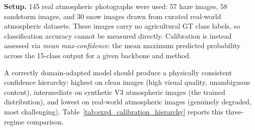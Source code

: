 \noindent \textbf{Setup.} 145 real atmospheric photographs were used: 57 haze images, 58 sandstorm images, and 30 snow images drawn from curated real-world atmospheric datasets. These images carry no agricultural GT class labels, so classification accuracy cannot be measured directly. Calibration is instead assessed via \emph{mean max-confidence}: the mean maximum predicted probability across the 15-class output for a given backbone and method.

\noindent A correctly domain-adapted model should produce a physically consistent confidence hierarchy: highest on clean images (high visual quality, unambiguous content), intermediate on synthetic V3 atmospheric images (the trained distribution), and lowest on real-world atmospheric images (genuinely degraded, most challenging). Table~\ref{tab:exp4_calibration_hierarchy} reports this three-regime comparison.

\begin{table}[htbp]
\centering
\caption{Experiment~4: Mean max-confidence of zero-shot CLIP vs V3-adapted linear probe across three data regimes and per weather domain. Lower confidence on atmospheric images reflects correct domain-awareness. The probe maintains the physically expected ordering (clean $>$ synthetic $>$ real-world) on both backbones.}
\label{tab:exp4_calibration_hierarchy}
\renewcommand{\arraystretch}{1.3}
\end{table}

